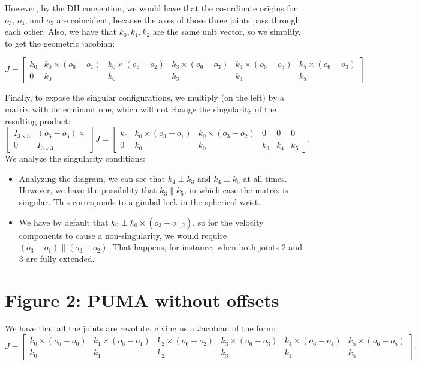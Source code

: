 \documentclass[11pt]{article}
\begin{document}
However, by the DH convention, we would have that the co-ordinate origins for $o_3$, $o_4$, and $o_5$ are coincident, because the axes of those three joints pass through each other.
Also, we have that $k_0, k_1, k_2$ are the same unit vector, so we simplify, to get the geometric jacobian:

\[
    J = \begin{bmatrix} k_0 & k_0 \times (o_6 - o_1) &  k_0 \times (o_6 - o_2) &  k_3 \times (o_6 - o_3) & k_4 \times (o_6 - o_3) &  k_5 \times (o_6 - o_3) \\ 0 & k_0 & k_0 & k_3 & k_4 & k_5 \end{bmatrix} 
.\] 

Finally, to expose the singular configurations, we multiply (on the left) by a matrix with determinant one, which will not change the singularity of the resulting product:
\[
    \begin{bmatrix} I_{3 \times  3} & (o_6 - o_3) \times \\ 0 & I_{3 \times  3} \end{bmatrix}  J = \begin{bmatrix} k_0 & k_0 \times (o_3 - o_1) & k_0 \times  (o_3 - o_2) & 0 & 0 & 0\\ 0 & k_0 & k_0 & k_3 & k_4 & k_5  \end{bmatrix} 
.\] 
We analyze the singularity conditions:
\begin{itemize}
    \item  Analyzing the diagram, we can see that $k_4 \perp k_3$ and $k_4 \perp k_5$ at all times. However, we have the possibility that $k_3 \parallel k_5$, in which case the matrix is singular.
        This corresponds to a gimbal lock in the spherical wrist.
    \item 
        We have by default that $k_0 \perp k_0 \times (o_3 - o_{1, 2})$, so for the velocity components to cause a non-singularity, we would require $(o_3 - o_1) \parallel (o_3 - o_2)$.
        That happens, for instance, when both joints 2 and 3 are fully extended.
\end{itemize}


\section{Figure 2: PUMA without offsets}

We have that all the joints are revolute, giving us a Jacobian of the form:
\[
    J = \begin{bmatrix} k_0 \times (o_6 - o_0)  & k_1 \times (o_6 - o_1) &  k_2 \times (o_6 - o_2) &  k_3 \times (o_6 - o_3) & k_4 \times (o_6 - o_4) &  k_5 \times (o_6 - o_5) \\ k_0 & k_1 & k_2 & k_3 & k_4 & k_5 \end{bmatrix} 
.\] 
\end{document}
